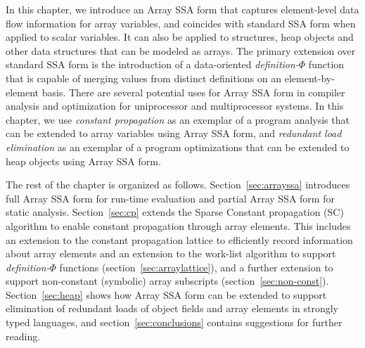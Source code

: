 In this chapter,
we introduce an Array SSA form 
that captures element-level data flow information for array variables, and
coincides with standard SSA form when applied to scalar variables.  
It can also be applied to structures, heap objects and other data structures
that can be modeled as arrays.
The primary extension over standard SSA form is the introduction of a
data-oriented {\em definition-$\Phi$} function that is capable of
merging values from distinct definitions on an element-by-element
basis. 
There are several potential uses for Array SSA form in compiler
analysis
and optimization for uniprocessor and multiprocessor systems.
In this chapter, we use
{\em constant propagation}
as an exemplar of a program analysis that can be extended to array variables
using Array SSA form, and {\em redundant load elimination} as an
exemplar  of a program optimizations that can be extended to heap objects using Array SSA form.

The rest of the chapter is organized as follows.
Section~\ref{sec:arrayssa} introduces full Array SSA form for run-time
evaluation and partial Array SSA form
for static analysis.  
Section~\ref{sec:cp} extends the Sparse
Constant propagation (SC) algorithm to enable
constant propagation through array elements.
This includes an extension to the constant
propagation lattice to efficiently
record information about array
elements and an extension to the
work-list algorithm to support  {\em definition-$\Phi$} functions (section~\ref{sec:arraylattice}), and
a further extension to support non-constant (symbolic) array
subscripts (section~\ref{sec:non-const}). 
Section~\ref{sec:heap} shows how Array SSA form can be extended to
support elimination of redundant loads of 
object fields and array elements in strongly typed languages,
and section~\ref{sec:conclusions} contains suggestions for further reading.


